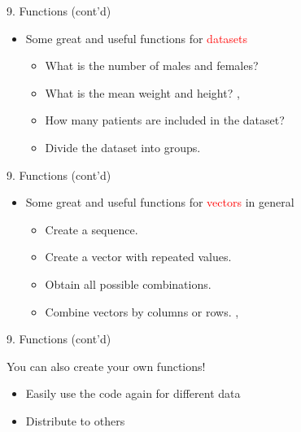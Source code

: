\documentclass[14pt, aspectratio=169, sectionpage=simple, xclolor=table]{beamer}
\begin{document}
\begin{frame}[fragile]{9. Functions (cont'd)}
\begin{itemize}
\item Some great and useful \R functions for \textcolor{red}{datasets}
\vspace{1ex}
\vspace{1ex}
\begin{itemize}
	\item What is the number of males and females? 
	\item What is the mean weight and height? , 
	\item How many patients are included in the dataset? 
	\item Divide the dataset into groups. 
\end{itemize}
\end{itemize}
\end{frame}
\begin{frame}[fragile]{9. Functions (cont'd)}
\begin{itemize}
\item Some great and useful \R functions for \textcolor{red}{vectors} in general
\vspace{1ex}
\vspace{1ex}
\begin{itemize}
\item Create a sequence. 
\item Create a vector with repeated values. 
\item Obtain all possible combinations. 
\item Combine vectors by columns or rows. , 
\end{itemize}
\end{itemize}
\end{frame}
\begin{frame}[label=functions]{9. Functions (cont'd)}
\begin{block}{You can also create your own functions!}
\begin{itemize}
\item Easily use the code again for different data
\item Distribute to others
\end{itemize}
\end{block}
\end{frame}
\end{document}
